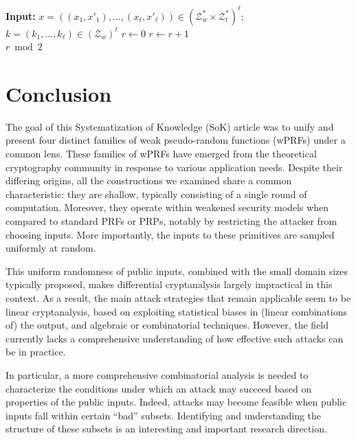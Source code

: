 \documentclass[journal=tosc,submission]{iacrtrans}
\theoremstyle{theorem}
\newcommand\Z{\mathcal{Z}}
\begin{document}
\begin{algorithm}
  \caption{\label{alg:ealpn}The {\sf EALPN} wPRF \\
    Parameters:  integers $N$, $t$, $\ell$,  $w = \lceil \frac{5N}{t} \rceil$}
  \begin{algorithmic}
  \State \textbf{Input:}  $x = ((x_1,x'_1), \dots, (x_\ell,x'_\ell)) \in ( \Z^*_{w}\times \Z^*_{t})^\ell$; $k = (k_1, \dots, k_{\ell}) \in (\Z_{w})^{\ell}$
    \State $r \gets 0$
        \State $r \gets r + 1$
    \EndIf
\EndFor\\
\Return $r \bmod 2$
 \end{algorithmic}
\end{algorithm}


\section{Conclusion}
\label{sec:conclusion}

The goal of this Systematization of Knowledge (SoK) article was to unify and present four distinct families of weak pseudo-random functions (wPRFs) under a common lens. These families of wPRFs have emerged from the theoretical cryptography community in response to various application needs. Despite their differing origins, all the constructions we examined share a common characteristic: they are shallow, typically consisting of a single round of computation. Moreover, they operate within weakened security models when compared to standard PRFs or PRPs, notably by restricting the attacker from choosing inputs. More importantly, the inputs to these primitives  are sampled uniformly at random.

This uniform randomness of public inputs, combined with the small domain sizes typically proposed, makes differential cryptanalysis largely impractical in this context. As a result, the main attack strategies that remain applicable seem to be linear cryptanalysis, based on exploiting statistical biases in (linear combinations of) the output, and algebraic or combinatorial techniques. However, the field currently lacks a comprehensive understanding of how effective such attacks can be in practice.

In particular, a more comprehensive combinatorial analysis is needed to characterize the conditions under which an attack may succeed based on properties of the public inputs. Indeed, attacks may become feasible when public inputs fall within certain ``bad'' subsets. Identifying and understanding the structure of these subsets is an interesting and important research direction.
\end{document}

